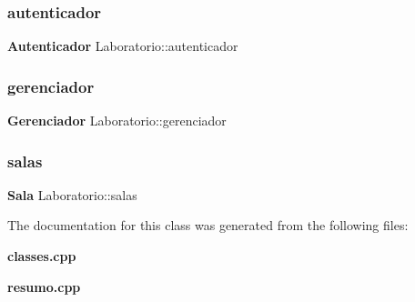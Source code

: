 \subsubsection{autenticador}
{\footnotesize\ttfamily \textbf{ Autenticador} Laboratorio\+::autenticador}

\mbox{\label{class_laboratorio_a5136b1e8ee1e2310316512714bc7bbe5}} 
\subsubsection{gerenciador}
{\footnotesize\ttfamily \textbf{ Gerenciador} Laboratorio\+::gerenciador}

\mbox{\label{class_laboratorio_aa72309b88b786e457f292a155550c7a6}} 
\subsubsection{salas}
{\footnotesize\ttfamily \textbf{ Sala} Laboratorio\+::salas}



The documentation for this class was generated from the following files\+:\begin{DoxyCompactItemize}
\item 
\textbf{ classes.\+cpp}\item 
\textbf{ resumo.\+cpp}\end{DoxyCompactItemize}
